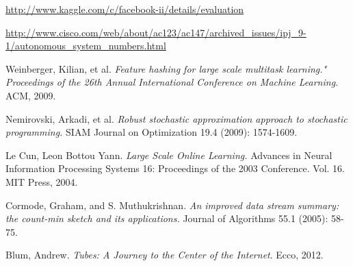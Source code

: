 \documentclass{article} %
\begin{document}
\small{
\begin{thebibliography}{99}

 \url{http://www.kaggle.com/c/facebook-ii/details/evaluation}

 \url{http://www.cisco.com/web/about/ac123/ac147/archived_issues/ipj_9-1/autonomous_system_numbers.html}

 Weinberger, Kilian, et al. {\it Feature hashing for large scale multitask learning." Proceedings of the 26th Annual International Conference on Machine Learning.} ACM, 2009.

 Nemirovski, Arkadi, et al. {\it Robust stochastic approximation approach to stochastic programming.} SIAM Journal on Optimization 19.4 (2009): 1574-1609.

 Le Cun, Leon Bottou Yann. {\it Large Scale Online Learning.} Advances in
Neural Information Processing Systems 16: Proceedings of the 2003
Conference. Vol. 16. MIT Press, 2004.

 Cormode, Graham, and S. Muthukrishnan. {\it An improved data
    stream summary: the count-min sketch and its applications.} Journal of
  Algorithms 55.1 (2005): 58-75.

 Blum, Andrew. {\it Tubes: A Journey to the Center of the
  Internet}. Ecco, 2012.

\end{thebibliography}
}
\end{document}
